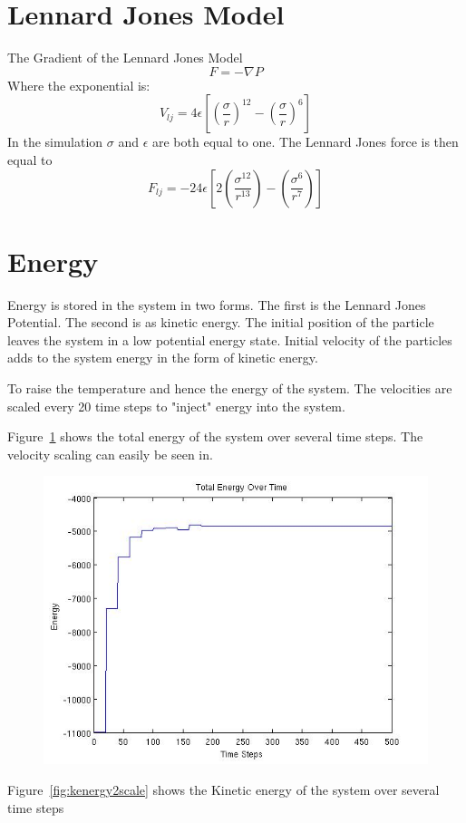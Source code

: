 \documentclass[10pt,a4paper]{article}
\begin{document}
\section{Lennard Jones Model}
The Gradient of the Lennard Jones Model
$$F= -\nabla P $$ Where the exponential is:
$$V_{lj} = 4 \epsilon [(\frac{\sigma}{r})^{12}-(\frac{\sigma}{r})^6]$$ 
In the simulation $\sigma$ and $\epsilon$ are both equal to one. The Lennard Jones force is then equal to
$$ F_{lj} = -24 \epsilon[2(\frac{\sigma^12}{r^{13}})-(\frac{\sigma^6}{r^7})] $$

\section{Energy}
Energy is stored in the system in two forms. The first is the Lennard Jones Potential. The second is as kinetic energy. The initial position of the particle leaves the  system in a low potential energy state. Initial velocity of the particles adds to the system energy in the form of kinetic energy. 

To raise the temperature and hence the energy of the system. The velocities are scaled every 20 time steps to "inject" energy into the system.

 Figure~\ref{fig:energy2scale} shows the total energy of the system over several time steps. The velocity scaling can easily be seen in.

\begin{figure}
	\centering
	\includegraphics[width=0.8\linewidth]{energy2scale}
	\caption[Energy with temperature set to 2]{}
	\label{fig:energy2scale}
\end{figure}

Figure~\ref{fig:kenergy2scale} shows the Kinetic energy of the system over several time steps
\end{document}
